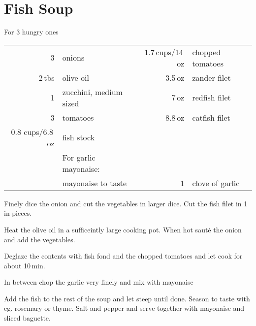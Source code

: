 \section{Fish Soup}
\begin{centering}
For 3 hungry ones
\end{centering}
\begin{table}[H]
\centering
\begin{tabular*}{1\textwidth}{rlrl}
3 & onions & 1.7\,cups/14\,oz & chopped tomatoes \\
2\,tbs & olive oil &3.5\,oz & zander filet\\
1 & zucchini, medium sized & 7\,oz & redfish filet\\
3 & tomatoes & 8.8\,oz & catfish filet\\
0.8 cups/6.8\,oz & fish stock && \\
&For garlic mayonaise:&&\\
& mayonaise to taste & 1 & clove of garlic\\
\end{tabular*}
\end{table}
\begin{Notes}
\item Finely dice the onion and cut the vegetables in larger dice. Cut the fish filet in 1\,in
  pieces. 
\item Heat the olive oil in a sufficeintly large cooking pot. When hot saut\'{e}
  the onion and add the vegetables.
\item Deglaze the contents with fish fond and the chopped tomatoes and let cook
  for about 10\,min. 
\item In between chop the garlic very finely and mix with mayonaise
\item Add the fish to the rest of the soup and let steep until done. Season to taste with eg.
  rosemary or thyme. Salt and pepper and serve together with mayonaise and
  sliced baguette.
\end{Notes}


